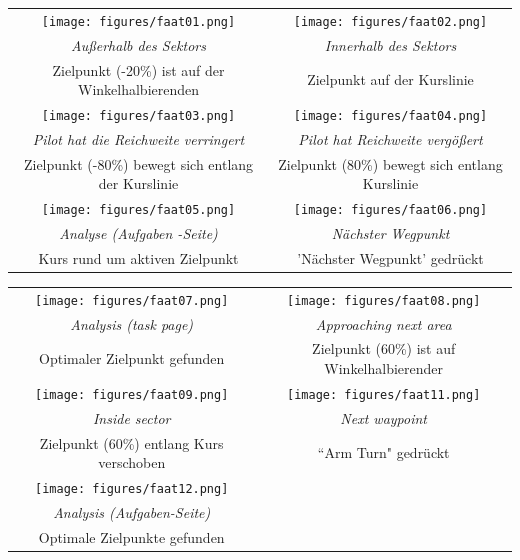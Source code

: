 \begin{maxipage}
\begin{center}
\begin{longtable}{|c|c|}
\toprule
\texttt{[image: figures/faat01.png]} &
\texttt{[image: figures/faat02.png]} \\
{\em Außerhalb des Sektors } & {\em Innerhalb des Sektors} \\
Zielpunkt (-20\%) ist auf der Winkelhalbierenden & Zielpunkt auf der Kurslinie \\

\midrule
\texttt{[image: figures/faat03.png]} &
\texttt{[image: figures/faat04.png]} \\
{\em Pilot hat die Reichweite verringert} & {\em Pilot hat Reichweite  vergößert} \\
Zielpunkt (-80\%) bewegt sich entlang der Kurslinie  & Zielpunkt (80\%) bewegt sich entlang Kurslinie \\

\midrule
\texttt{[image: figures/faat05.png]} &
\texttt{[image: figures/faat06.png]} \\
{\em Analyse (Aufgaben -Seite)} & {\em Nächster Wegpunkt} \\
Kurs rund um aktiven Zielpunkt & 'Nächster Wegpunkt' gedrückt\\
\bottomrule
\end{longtable}
\end{center}
\end{maxipage}

\begin{maxipage}
\begin{center}
\begin{longtable}{|c|c|}
\toprule
\texttt{[image: figures/faat07.png]} &
\texttt{[image: figures/faat08.png]} \\
{\em Analysis (task page)} & {\em Approaching next area} \\
Optimaler Zielpunkt gefunden & Zielpunkt (60\%) ist auf Winkelhalbierender\\

\midrule
\texttt{[image: figures/faat09.png]} &
\texttt{[image: figures/faat11.png]} \\
{\em Inside sector} & {\em Next waypoint} \\
Zielpunkt (60\%) entlang Kurs verschoben & ``Arm Turn" gedrückt\\

\midrule
\texttt{[image: figures/faat12.png]} &  \\
{\em Analysis (Aufgaben-Seite)} &  \\
Optimale Zielpunkte gefunden  & \\

\bottomrule
\end{longtable}
\end{center}
\end{maxipage}

